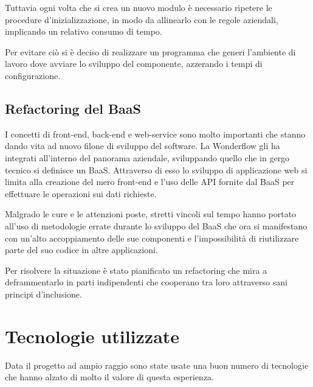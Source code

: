 Tuttavia ogni volta che si crea un nuovo modulo è necessario ripetere le
procedure d'inizializzazione, in modo da allinearlo con le regole aziendali,
implicando un relativo consumo di tempo.

Per evitare ciò si è deciso di realizzare un programma che generi l'ambiente di
lavoro dove avviare lo sviluppo del componente, azzerando i tempi di
configurazione.

\subsection{Refactoring del BaaS}
I concetti di \gls{front-end}, \gls{back-end} e \gls{web-service} sono molto
importanti che stanno dando vita ad nuovo filone di sviluppo del software.
La Wonderflow gli ha integrati all'interno del panorama aziendale, sviluppando
quello che in gergo tecnico si definisce un \gls{BaaS}. Attraverso
di esso lo sviluppo di applicazione web si limita alla creazione del mero
\gls{front-end} e l'uso delle \gls{API} fornite dal \gls{BaaS} per effettuare
le operazioni sui dati richieste.

Malgrado le cure e le attenzioni poste, stretti vincoli sul tempo hanno portato
all'uso di metodologie errate durante lo sviluppo del \gls{BaaS} che ora si
manifestano con un'alto accoppiamento delle sue componenti e l'impossibilità
di riutilizzare parte del suo codice in altre applicazioni.

Per risolvere la situazione è stato pianificato un \gls{refactoring} che mira
a deframmentarlo in parti indipendenti che cooperano tra loro attraverso
sani principi d'inclusione.

\section{Tecnologie utilizzate}
Data il progetto ad ampio raggio sono state usate una buon numero di tecnologie
che hanno alzato di molto il valore di questa esperienza.
